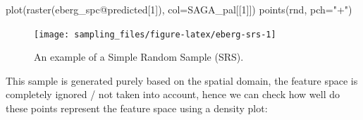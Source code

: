 \documentclass[
  graybox,natbib,nospthms]{svmono}
\newenvironment{Shaded}{\begin{snugshade}}{\end{snugshade}}
\newcommand{\AttributeTok}[1]{\textcolor[rgb]{0.61,0.61,0.61}{#1}}
\newcommand{\DecValTok}[1]{\textcolor[rgb]{0.06,0.06,0.06}{#1}}
\newcommand{\FunctionTok}[1]{\textcolor[rgb]{0,0,0}{#1}}
\newcommand{\NormalTok}[1]{#1}
\newcommand{\OtherTok}[1]{\textcolor[rgb]{0.37,0.37,0.37}{#1}}
\newcommand{\SpecialCharTok}[1]{\textcolor[rgb]{0,0,0}{#1}}
\newcommand{\StringTok}[1]{\textcolor[rgb]{0.5,0.5,0.5}{#1}}
\begin{document}
\begin{Shaded}
\begin{Highlighting}[]
\FunctionTok{plot}\NormalTok{(}\FunctionTok{raster}\NormalTok{(eberg\_spc}\SpecialCharTok{@}\NormalTok{predicted[}\DecValTok{1}\NormalTok{]), }\AttributeTok{col=}\NormalTok{SAGA\_pal[[}\DecValTok{1}\NormalTok{]])}
\FunctionTok{points}\NormalTok{(rnd, }\AttributeTok{pch=}\StringTok{"+"}\NormalTok{)}
\end{Highlighting}
\end{Shaded}

\begin{figure}

{\centering \texttt{[image: sampling\_files/figure-latex/eberg-srs-1]} 

}

\caption{An example of a Simple Random Sample (SRS).}\label{fig:eberg-srs}
\end{figure}

This sample is generated purely based on the spatial domain, the feature space
is completely ignored / not taken into account, hence we can check how well do
these points represent the feature space using a density plot:

\begin{Shaded}
\end{Shaded}
\end{document}
